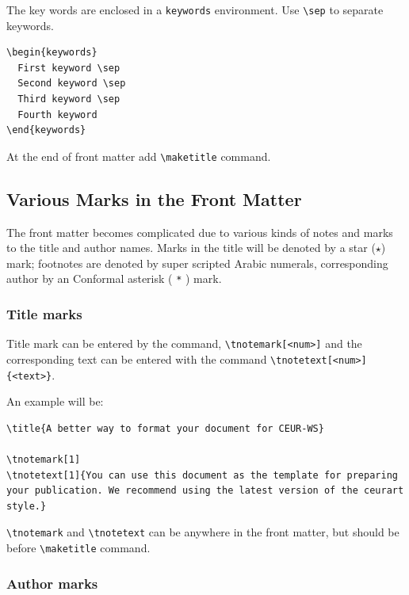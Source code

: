 \documentclass[%
]{ceurart}
\begin{document}
The key words are enclosed in a
\verb|keywords|
environment. Use
\verb|\sep|
 to separate keywords.

\begin{lstlisting}[language={[latex]TeX}]
\begin{keywords}
  First keyword \sep
  Second keyword \sep
  Third keyword \sep
  Fourth keyword
\end{keywords}
\end{lstlisting}

At the end of front matter add
\verb|\maketitle|
 command.

\subsection{Various Marks in the Front Matter}

The front matter becomes complicated due to various kinds of notes and marks to the title and author names.
Marks in the title will be denoted by a star ($\star$) mark; footnotes are denoted by super scripted Arabic numerals, corresponding author by an Conformal asterisk (
\verb|*|
) mark.

\subsubsection{Title marks}

Title mark can be entered by the command,
\verb|\tnotemark[<num>]|
and the corresponding text can be entered with the command
\verb|\tnotetext[<num>]{<text>}|.

An example will be:
\begin{lstlisting}[language={[latex]TeX}]
\title{A better way to format your document for CEUR-WS}

\tnotemark[1]
\tnotetext[1]{You can use this document as the template for preparing your publication. We recommend using the latest version of the ceurart style.}
\end{lstlisting}

\verb|\tnotemark|
 and
\verb|\tnotetext|
 can be anywhere in the front matter, but should be before
\verb|\maketitle|
 command.

\subsubsection{Author marks}
\end{document}

